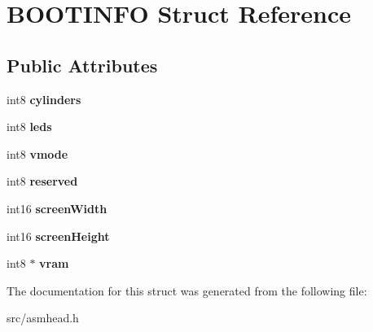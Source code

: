 \hypertarget{struct_b_o_o_t_i_n_f_o}{}\section{B\+O\+O\+T\+I\+N\+F\+O Struct Reference}
\label{struct_b_o_o_t_i_n_f_o}
\subsection*{Public Attributes}
\begin{DoxyCompactItemize}
\item 
\hypertarget{struct_b_o_o_t_i_n_f_o_a91e6b7afdd5a986a1ab28c91220c9fc2}{}int8 {\bfseries cylinders}\label{struct_b_o_o_t_i_n_f_o_a91e6b7afdd5a986a1ab28c91220c9fc2}

\item 
\hypertarget{struct_b_o_o_t_i_n_f_o_af42ebdd8b9c82be09dc0850310fe24f4}{}int8 {\bfseries leds}\label{struct_b_o_o_t_i_n_f_o_af42ebdd8b9c82be09dc0850310fe24f4}

\item 
\hypertarget{struct_b_o_o_t_i_n_f_o_ab2417f1a69e51de5c3c30babfe0806f8}{}int8 {\bfseries vmode}\label{struct_b_o_o_t_i_n_f_o_ab2417f1a69e51de5c3c30babfe0806f8}

\item 
\hypertarget{struct_b_o_o_t_i_n_f_o_ac65a1ec72c8ca829782258a5b5bcc291}{}int8 {\bfseries reserved}\label{struct_b_o_o_t_i_n_f_o_ac65a1ec72c8ca829782258a5b5bcc291}

\item 
\hypertarget{struct_b_o_o_t_i_n_f_o_aa809774bcc377008e3ae549b94702037}{}int16 {\bfseries screen\+Width}\label{struct_b_o_o_t_i_n_f_o_aa809774bcc377008e3ae549b94702037}

\item 
\hypertarget{struct_b_o_o_t_i_n_f_o_a9b6e49516e3184effb08f53255393cfe}{}int16 {\bfseries screen\+Height}\label{struct_b_o_o_t_i_n_f_o_a9b6e49516e3184effb08f53255393cfe}

\item 
\hypertarget{struct_b_o_o_t_i_n_f_o_a225e70f009e46698af20b2a7a6f04c5c}{}int8 $\ast$ {\bfseries vram}\label{struct_b_o_o_t_i_n_f_o_a225e70f009e46698af20b2a7a6f04c5c}

\end{DoxyCompactItemize}


The documentation for this struct was generated from the following file\+:\begin{DoxyCompactItemize}
\item 
src/asmhead.\+h\end{DoxyCompactItemize}
